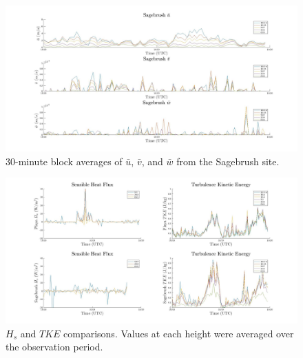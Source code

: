 \documentclass[]{article}
\begin{document}
\begin{figure}
	\centering
	\includegraphics[width=\textwidth]{sagerotate}
	\caption{30-minute block averages of $\bar{u}$, $\bar{v}$, and $\bar{w}$ from the Sagebrush site.}
	\label{fig:sagerotate}
\end{figure}

%

\begin{figure}
	\centering
	\includegraphics[width=\textwidth]{hstkeimproved}
	\caption{$H_s$ and $TKE$ comparisons. Values at each height were averaged over the observation period.}
	\label{fig:hstke}
\end{figure}
\end{document}
